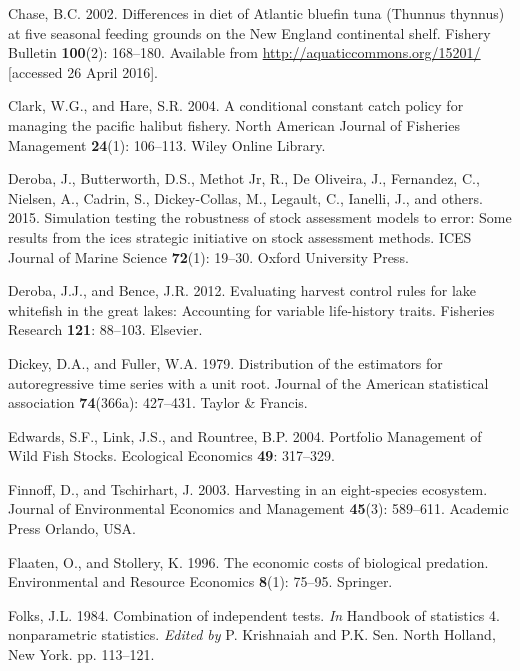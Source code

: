 \documentclass[]{article}
\begin{document}
\hypertarget{ref-chase_differences_2002}{}
Chase, B.C. 2002. Differences in diet of Atlantic bluefin tuna (Thunnus
thynnus) at five seasonal feeding grounds on the New England continental
shelf. Fishery Bulletin \textbf{100}(2): 168--180. Available from
\url{http://aquaticcommons.org/15201/} {[}accessed 26 April 2016{]}.

\hypertarget{ref-clark2004conditional}{}
Clark, W.G., and Hare, S.R. 2004. A conditional constant catch policy
for managing the pacific halibut fishery. North American Journal of
Fisheries Management \textbf{24}(1): 106--113. Wiley Online Library.

\hypertarget{ref-deroba2015simulation}{}
Deroba, J., Butterworth, D.S., Methot Jr, R., De Oliveira, J.,
Fernandez, C., Nielsen, A., Cadrin, S., Dickey-Collas, M., Legault, C.,
Ianelli, J., and others. 2015. Simulation testing the robustness of
stock assessment models to error: Some results from the ices strategic
initiative on stock assessment methods. ICES Journal of Marine Science
\textbf{72}(1): 19--30. Oxford University Press.

\hypertarget{ref-Deroba2012Evaluating}{}
Deroba, J.J., and Bence, J.R. 2012. Evaluating harvest control rules for
lake whitefish in the great lakes: Accounting for variable life-history
traits. Fisheries Research \textbf{121}: 88--103. Elsevier.

\hypertarget{ref-Dickey1979DistributionRoot}{}
Dickey, D.A., and Fuller, W.A. 1979. Distribution of the estimators for
autoregressive time series with a unit root. Journal of the American
statistical association \textbf{74}(366a): 427--431. Taylor \& Francis.

\hypertarget{ref-Edwards2004PortfolioStocks}{}
Edwards, S.F., Link, J.S., and Rountree, B.P. 2004. Portfolio Management
of Wild Fish Stocks. Ecological Economics \textbf{49}: 317--329.

\hypertarget{ref-Finnoff2003HarvestingEcosystem}{}
Finnoff, D., and Tschirhart, J. 2003. Harvesting in an eight-species
ecosystem. Journal of Environmental Economics and Management
\textbf{45}(3): 589--611. Academic Press Orlando, USA.

\hypertarget{ref-Flaaten1996ThePredation}{}
Flaaten, O., and Stollery, K. 1996. The economic costs of biological
predation. Environmental and Resource Economics \textbf{8}(1): 75--95.
Springer.

\hypertarget{ref-Folks1984CombinationTests}{}
Folks, J.L. 1984. Combination of independent tests. \emph{In} Handbook
of statistics 4. nonparametric statistics. \emph{Edited by} P.
Krishnaiah and P.K. Sen. North Holland, New York. pp. 113--121.
\end{document}
